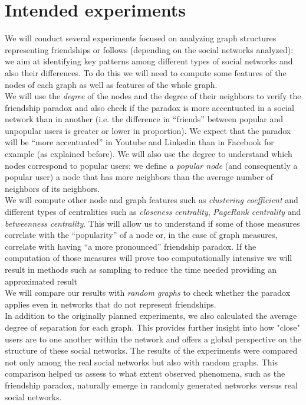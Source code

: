 \documentclass{article}
\begin{document}
\section{Intended experiments}
We will conduct several experiments focused on analyzing graph structures representing friendships or follows (depending on the social networks analyzed): we aim at identifying key patterns among different types of social networks and also their differences. To do this we will need to compute some features of the nodes of each graph as well as features of the whole graph.\\
We will use the \textit{degree} of the nodes and the degree of their neighbors to verify the friendship paradox and also check if the paradox is more accentuated in a social network than in another (i.e. the difference in “friends” between popular and unpopular users is greater or lower in proportion). We expect that the paradox will be “more accentuated” in Youtube and Linkedin than in Facebook for example (as explained before). We will also use the degree to understand which nodes correspond to popular users: we define a \textit{popular node} (and consequently a popular user) a node that has more neighbors than the average number of neighbors of its neighbors.\\
We will compute other node and graph features such as \textit{clustering coefficient} and different types of centralities such as \textit{closeness centrality}, \textit{PageRank centrality} and \textit{betweenness centrality}. This will allow us to understand if some of those measures correlate with the “popularity” of a node or, in the case of graph measures, correlate with having “a more pronounced” friendship paradox. If the computation of those measures will prove too computationally intensive we will result in methods such as sampling to reduce the time needed providing an approximated result\\
We will compare our results with \textit{random graphs} to check whether the paradox applies even in networks that do not represent friendships. \\

In addition to the originally planned experiments, we also calculated the average degree of separation for each graph. This provides further insight into how "close" users are to one another within the network and offers a global perspective on the structure of these social networks. The results of the experiments were compared not only among the real social networks but also with random graphs. This comparison helped us assess to what extent observed phenomena, such as the friendship paradox, naturally emerge in randomly generated networks versus real social networks. \\
\end{document}

